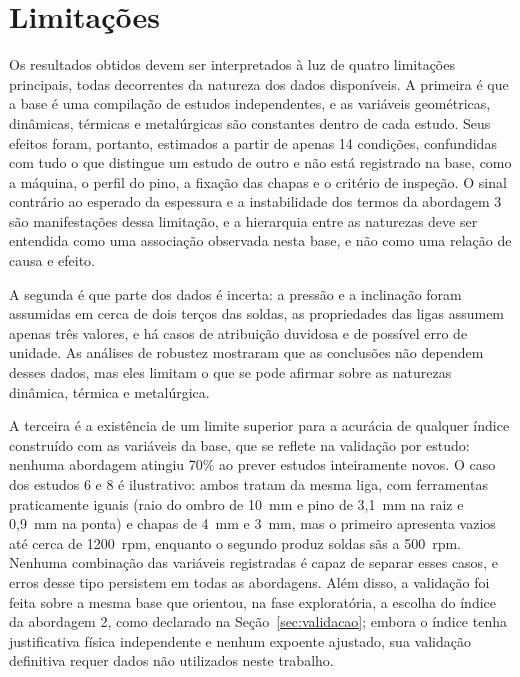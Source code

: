 \documentclass[12pt,openany]{report}
\begin{document}
\section{Limitações}
\label{sec:limitacoes}

Os resultados obtidos devem ser interpretados à luz de quatro limitações principais, todas decorrentes da natureza dos dados disponíveis. A primeira é que a base é uma compilação de estudos independentes, e as variáveis geométricas, dinâmicas, térmicas e metalúrgicas são constantes dentro de cada estudo. Seus efeitos foram, portanto, estimados a partir de apenas 14 condições, confundidas com tudo o que distingue um estudo de outro e não está registrado na base, como a máquina, o perfil do pino, a fixação das chapas e o critério de inspeção. O sinal contrário ao esperado da espessura e a instabilidade dos termos da abordagem 3 são manifestações dessa limitação, e a hierarquia entre as naturezas deve ser entendida como uma associação observada nesta base, e não como uma relação de causa e efeito.

A segunda é que parte dos dados é incerta: a pressão e a inclinação foram assumidas em cerca de dois terços das soldas, as propriedades das ligas assumem apenas três valores, e há casos de atribuição duvidosa e de possível erro de unidade. As análises de robustez mostraram que as conclusões não dependem desses dados, mas eles limitam o que se pode afirmar sobre as naturezas dinâmica, térmica e metalúrgica.

A terceira é a existência de um limite superior para a acurácia de qualquer índice construído com as variáveis da base, que se reflete na validação por estudo: nenhuma abordagem atingiu 70\% ao prever estudos inteiramente novos. O caso dos estudos 6 e 8 é ilustrativo: ambos tratam da mesma liga, com ferramentas praticamente iguais (raio do ombro de 10~mm e pino de 3,1~mm na raiz e 0,9~mm na ponta) e chapas de 4~mm e 3~mm, mas o primeiro apresenta vazios até cerca de 1200~rpm, enquanto o segundo produz soldas sãs a 500~rpm. Nenhuma combinação das variáveis registradas é capaz de separar esses casos, e erros desse tipo persistem em todas as abordagens. Além disso, a validação foi feita sobre a mesma base que orientou, na fase exploratória, a escolha do índice da abordagem 2, como declarado na Seção~\ref{sec:validacao}; embora o índice tenha justificativa física independente e nenhum expoente ajustado, sua validação definitiva requer dados não utilizados neste trabalho.
\end{document}

